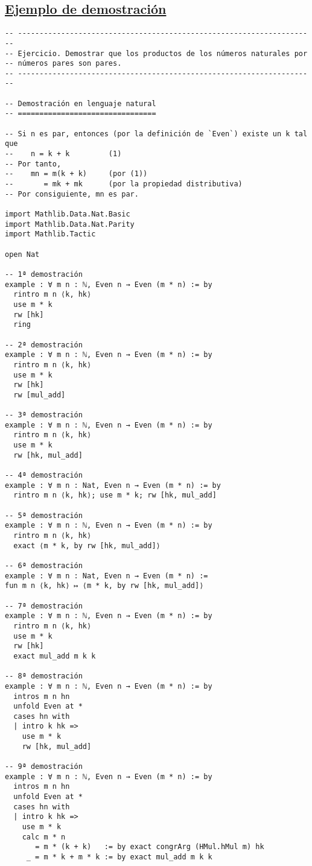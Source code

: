 \subsection{\href{./src/Introduccion/Ejemplo\_de\_demostracion.lean}{Ejemplo de demostración}}
\label{sec:orgb22cf80}
\begin{verbatim}
-- ---------------------------------------------------------------------
-- Ejercicio. Demostrar que los productos de los números naturales por
-- números pares son pares.
-- ---------------------------------------------------------------------

-- Demostración en lenguaje natural
-- ================================

-- Si n es par, entonces (por la definición de `Even`) existe un k tal que
--    n = k + k         (1)
-- Por tanto,
--    mn = m(k + k)     (por (1))
--       = mk + mk      (por la propiedad distributiva)
-- Por consiguiente, mn es par.

import Mathlib.Data.Nat.Basic
import Mathlib.Data.Nat.Parity
import Mathlib.Tactic

open Nat

-- 1ª demostración
example : ∀ m n : ℕ, Even n → Even (m * n) := by
  rintro m n ⟨k, hk⟩
  use m * k
  rw [hk]
  ring

-- 2ª demostración
example : ∀ m n : ℕ, Even n → Even (m * n) := by
  rintro m n ⟨k, hk⟩
  use m * k
  rw [hk]
  rw [mul_add]

-- 3ª demostración
example : ∀ m n : ℕ, Even n → Even (m * n) := by
  rintro m n ⟨k, hk⟩
  use m * k
  rw [hk, mul_add]

-- 4ª demostración
example : ∀ m n : Nat, Even n → Even (m * n) := by
  rintro m n ⟨k, hk⟩; use m * k; rw [hk, mul_add]

-- 5ª demostración
example : ∀ m n : ℕ, Even n → Even (m * n) := by
  rintro m n ⟨k, hk⟩
  exact ⟨m * k, by rw [hk, mul_add]⟩

-- 6ª demostración
example : ∀ m n : Nat, Even n → Even (m * n) :=
fun m n ⟨k, hk⟩ ↦ ⟨m * k, by rw [hk, mul_add]⟩

-- 7ª demostración
example : ∀ m n : ℕ, Even n → Even (m * n) := by
  rintro m n ⟨k, hk⟩
  use m * k
  rw [hk]
  exact mul_add m k k

-- 8ª demostración
example : ∀ m n : ℕ, Even n → Even (m * n) := by
  intros m n hn
  unfold Even at *
  cases hn with
  | intro k hk =>
    use m * k
    rw [hk, mul_add]

-- 9ª demostración
example : ∀ m n : ℕ, Even n → Even (m * n) := by
  intros m n hn
  unfold Even at *
  cases hn with
  | intro k hk =>
    use m * k
    calc m * n
       = m * (k + k)   := by exact congrArg (HMul.hMul m) hk
     _ = m * k + m * k := by exact mul_add m k k


\end{verbatim}
